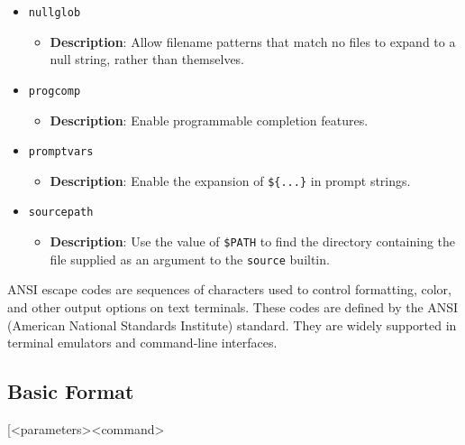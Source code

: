\documentclass{report}
\begin{document}
\begin{itemize}
        \item \texttt{nullglob}
            \begin{itemize}
                \item \textbf{Description}: Allow filename patterns that match no files to expand to a null string, rather than themselves.
            \end{itemize}

        \item \texttt{progcomp}
            \begin{itemize}
                \item \textbf{Description}: Enable programmable completion features.
            \end{itemize}

        \item \texttt{promptvars}
            \begin{itemize}
                \item \textbf{Description}: Enable the expansion of \texttt{\$\{...\}} in prompt strings.
            \end{itemize}

        \item \texttt{sourcepath}
            \begin{itemize}
                \item \textbf{Description}: Use the value of \texttt{\$PATH} to find the directory containing the file supplied as an argument to the \texttt{source} builtin.
            \end{itemize}
    \end{itemize}    

    \pagebreak 
    \bigbreak \noindent 
    \begin{concept}
        ANSI escape codes are sequences of characters used to control formatting, color, and other output options on text terminals. These codes are defined by the ANSI (American National Standards Institute) standard. They are widely supported in terminal emulators and command-line interfaces.
    \end{concept}
    \bigbreak \noindent 
    \subsection{Basic Format}
    \bigbreak \noindent 
    \begin{bashcode}
        \e[<parameters><command>
    \end{bashcode}
\end{document}
